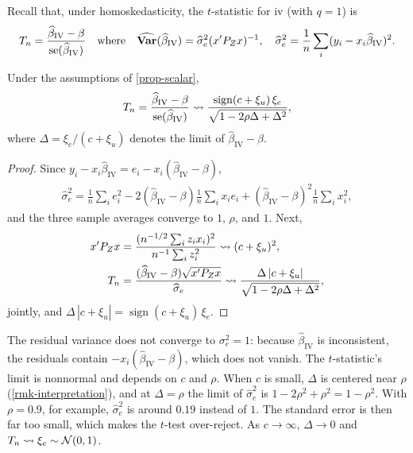 \documentclass[a4paper,12pt]{article}
\begin{document}
Recall that, under homoskedasticity, the $t$-statistic for \gls{iv} (with $q=1$) is
\begin{align*}
	T_n=\frac{\widehat\beta_{\mathrm{IV}}-\beta}{\operatorname{se}(\widehat\beta_{\mathrm{IV}})}
	\quad\text{where}\quad
	\widehat{\operatorname{\text{\textrm{\upshape\textbf{Var}}}}}(\widehat\beta_{\mathrm{IV}})
	= \widehat\sigma_e^2 (x^{\prime} P_Zx)^{-1},
	\quad
	\widehat\sigma_e^2 = \frac1n\sum_i(y_i-x_i\widehat\beta_{\mathrm{IV}})^2.
\end{align*}

\begin{proposition}
	Under the assumptions of \autoref{prop-scalar},
	\begin{align}
		T_n = \frac{\widehat\beta_{\mathrm{IV}}-\beta}{\operatorname{se}(\widehat\beta_{\mathrm{IV}})}
		\overset{}{\leadsto}\frac{\operatorname{sign}(c+\xi_u)\,\xi_e}{\sqrt{1-2\rho\Delta+\Delta^2}},
	\end{align}
	where $\Delta=\xi_e/(c+\xi_u)$ denotes the limit of $\widehat\beta_{\mathrm{IV}}-\beta$.
\end{proposition}
\begin{proof}
	Since $y_i-x_i\widehat\beta_{\mathrm{IV}}=e_i-x_i(\widehat\beta_{\mathrm{IV}}-\beta)$,
	\begin{align*}
		\widehat\sigma_e^2
		=\frac1n\sum_ie_i^2-2(\widehat\beta_{\mathrm{IV}}-\beta)\frac1n\sum_ix_ie_i+(\widehat\beta_{\mathrm{IV}}-\beta)^2\frac1n\sum_ix_i^2,
	\end{align*}
	and the three sample averages converge to $1$, $\rho$, and $1$.
	Next,
	\begin{align*}
		x^{\prime} P_Zx&=\frac{(n^{-1/2}\sum_iz_ix_i)^2}{n^{-1}\sum_iz_i^2}\overset{}{\leadsto}(c+\xi_u)^2,\\
		T_n&=\frac{(\widehat\beta_{\mathrm{IV}}-\beta)\sqrt{x^{\prime} P_Zx}}{\widehat\sigma_e}
		\overset{}{\leadsto}\frac{\Delta\,|c+\xi_u|}{\sqrt{1-2\rho\Delta+\Delta^2}},
	\end{align*}
	jointly, and $\Delta\,|c+\xi_u|=\operatorname{sign}(c+\xi_u)\,\xi_e$.
\end{proof}

\begin{remark}
	The residual variance does not converge to $\sigma_e^2=1$:
	because $\widehat\beta_{\mathrm{IV}}$ is inconsistent, the residuals contain $-x_i(\widehat\beta_{\mathrm{IV}}-\beta)$,
	which does not vanish.
	The $t$-statistic's limit is nonnormal and depends on $c$ and $\rho$.
	When $c$ is small, $\Delta$ is centered near $\rho$ (\autoref{rmk-interpretation}),
	and at $\Delta=\rho$ the limit of $\widehat\sigma_e^2$ is $1-2\rho^2+\rho^2=1-\rho^2$.
	With $\rho=0.9$, for example, $\widehat\sigma_e^2$ is around $0.19$ instead of $1$.
	The standard error is then far too small, which makes the $t$-test over-reject.
	As $c\to\infty$, $\Delta\to0$ and $T_n\overset{}{\leadsto}\xi_e\sim\operatorname{\mathcal{N}}(0,1)$.
\end{remark}
\end{document}
